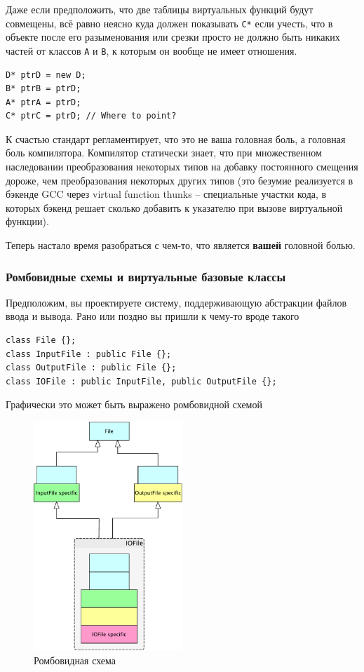 \documentclass[a4paper,12pt,oneside]{article}
\begin{document}
Даже если предположить, что две таблицы виртуальных функций будут совмещены, всё равно неясно куда должен показывать \lstinline!С*! если учесть, что в объекте после его разыменования или срезки просто не должно быть никаких частей от классов \lstinline!A! и \lstinline!B!, к которым он вообще не имеет отношения.

\begin{lstlisting}
D* ptrD = new D;
B* ptrB = ptrD;
A* ptrA = ptrD;
C* ptrC = ptrD; // Where to point?
\end{lstlisting}

К счастью стандарт регламентирует, что это не ваша головная боль, а головная боль компилятора. Компилятор статически знает, что при множественном наследовании преобразования некоторых типов на добавку постоянного смещения дороже, чем преобразования некоторых других типов (это безумие реализуется в бэкенде GCC через virtual function thunks -- специальные участки кода, в которых бэкенд решает сколько добавить к указателю при вызове виртуальной функции).

Теперь настало время разобраться с чем-то, что является \textbf{вашей} головной болью.

\subsubsection{Ромбовидные схемы и виртуальные базовые классы}\label{RombSchemas}

Предположим, вы проектируете систему, поддерживающую абстракции файлов ввода и вывода. Рано или поздно вы пришли к чему-то вроде такого

\begin{lstlisting}
class File {};
class InputFile : public File {};
class OutputFile : public File {};
class IOFile : public InputFile, public OutputFile {};
\end{lstlisting}

Графически это может быть выражено ромбовидной схемой

\begin{figure}[h!]
\centering
\includegraphics[width=0.5\textwidth]{illustrations/romb-crop.pdf}
\caption{Ромбовидная схема}
\label{fig:romb-crop}
\end{figure}
\end{document}
